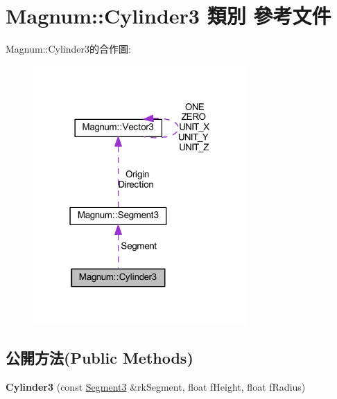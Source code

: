 \hypertarget{class_magnum_1_1_cylinder3}{}\section{Magnum\+:\+:Cylinder3 類別 參考文件}
\label{class_magnum_1_1_cylinder3}


Magnum\+:\+:Cylinder3的合作圖\+:\nopagebreak
\begin{figure}[H]
\begin{center}
\leavevmode
\includegraphics[width=231pt]{class_magnum_1_1_cylinder3__coll__graph}
\end{center}
\end{figure}
\subsection*{公開方法(Public Methods)}
\begin{DoxyCompactItemize}
\item 
{\bfseries Cylinder3} (const \hyperlink{class_magnum_1_1_segment3}{Segment3} \&rk\+Segment, float f\+Height, float f\+Radius)\hypertarget{class_magnum_1_1_cylinder3_aafda8c791522892da695c957515e9464}{}\label{class_magnum_1_1_cylinder3_aafda8c791522892da695c957515e9464}

\end{DoxyCompactItemize}
